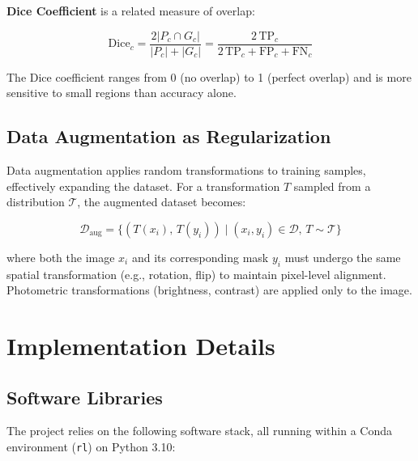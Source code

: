\documentclass[12pt,a4paper]{article}
\begin{document}
\textbf{Dice Coefficient} is a related measure of overlap:

\begin{equation}
    \text{Dice}_c = \frac{2|P_c \cap G_c|}{|P_c| + |G_c|} = \frac{2\,\text{TP}_c}{2\,\text{TP}_c + \text{FP}_c + \text{FN}_c}
\end{equation}

The Dice coefficient ranges from 0 (no overlap) to 1 (perfect overlap) and is more sensitive to small regions than accuracy alone.

\subsection{Data Augmentation as Regularization}

Data augmentation applies random transformations to training samples, effectively expanding the dataset. For a transformation $T$ sampled from a distribution $\mathcal{T}$, the augmented dataset becomes:

\begin{equation}
    \mathcal{D}_{\text{aug}} = \{(T(x_i),\, T(y_i)) \mid (x_i, y_i) \in \mathcal{D},\, T \sim \mathcal{T}\}
\end{equation}

where both the image $x_i$ and its corresponding mask $y_i$ must undergo the same spatial transformation (e.g., rotation, flip) to maintain pixel-level alignment. Photometric transformations (brightness, contrast) are applied only to the image.

\section{Implementation Details}
\label{sec:implementation}

\subsection{Software Libraries}

The project relies on the following software stack, all running within a Conda environment (\texttt{rl}) on Python 3.10:
\end{document}
